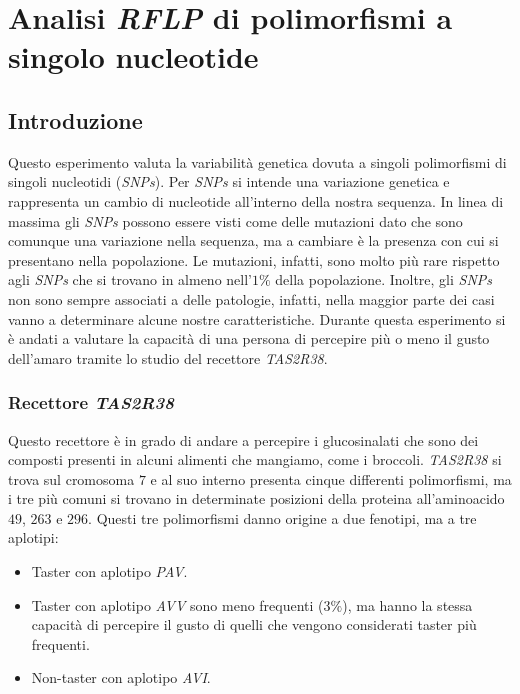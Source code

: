 \section*{Analisi \emph{RFLP} di polimorfismi a singolo nucleotide}

	\subsection*{Introduzione}
	Questo esperimento valuta la variabilità genetica dovuta a singoli polimorfismi di singoli nucleotidi (\emph{SNPs}). 
	Per \emph{SNPs} si intende una variazione genetica e rappresenta un cambio di nucleotide all'interno della nostra sequenza. 
	In linea di massima gli \emph{SNPs} possono essere visti come delle mutazioni dato che sono comunque una variazione nella sequenza, ma a cambiare è la presenza con cui si presentano nella popolazione. 
	Le mutazioni, infatti, sono molto più rare  rispetto agli \emph{SNPs} che si trovano in almeno nell'$1\%$ della popolazione. 
	Inoltre, gli \emph{SNPs} non sono sempre associati a delle patologie, infatti, nella maggior parte dei casi vanno a determinare alcune nostre caratteristiche. 
	Durante questa esperimento si è andati a valutare la capacità di una persona di percepire più o meno il gusto dell'amaro tramite lo studio del recettore \emph{TAS2R38}.
		
		\subsubsection*{Recettore \emph{TAS2R38}}
		Questo recettore è in grado di andare a percepire i glucosinalati che sono dei composti presenti in alcuni alimenti che mangiamo, come i broccoli. 
		\emph{TAS2R38} si trova sul cromosoma $7$ e al suo interno presenta cinque differenti polimorfismi, ma i tre più comuni si trovano in determinate posizioni della proteina all'aminoacido $49$, $263$ e $296$. 
		Questi tre polimorfismi danno origine a due fenotipi, ma a tre aplotipi:
		\begin{multicols}{2}
		\begin{itemize}
			\item Taster con aplotipo \emph{PAV}.
			\item Taster con aplotipo \emph{AVV} sono meno frequenti ($3\%$), ma hanno la stessa capacità di percepire il gusto di quelli che vengono considerati taster più frequenti.
			\item Non-taster con aplotipo \emph{AVI}. 
		\end{itemize}
		\end{multicols}
    
